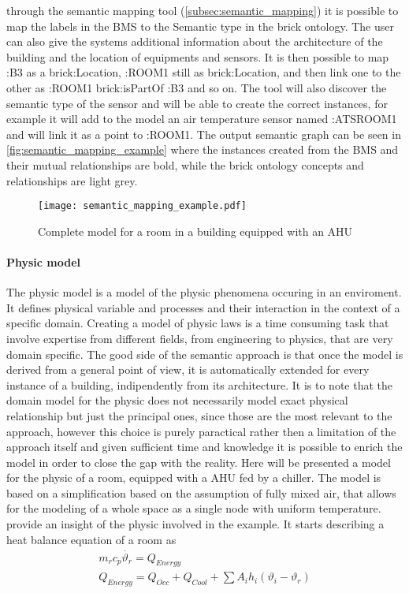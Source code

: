 through the semantic mapping tool (\ref{subsec:semantic_mapping}) it is possible to map the labels in the BMS to the Semantic type in the brick ontology. The user can also give the systems additional information about the architecture of the building and the location of equipments and sensors. It is then possible to map :B3 as a brick:Location, :ROOM1 still as brick:Location, and then link one to the other as :ROOM1 brick:isPartOf :B3 and so on. The tool will also discover the semantic type of the sensor and will be able to create the correct instances, for example it will add to the model an air temperature sensor named :ATSROOM1 and will link it as a point to :ROOM1. The output semantic graph can be seen in \autoref{fig:semantic_mapping_example} where the instances created from the BMS and their mutual relationships are bold, while the brick ontology concepts and relationships are light grey.

\begin{figure}
  \texttt{[image: semantic\_mapping\_example.pdf]}
  \caption{Complete model for a room in a building equipped with an AHU}
  \label{fig:semantic_mapping_example}
\end{figure}

\paragraph{Physic model}
The physic model is a model of the physic phenomena occuring in an enviroment. It defines physical variable and processes and their interaction in the context of a specific domain. Creating a model of physic laws is a time consuming task that involve expertise from different fields, from engineering to physics, that are very domain specific. The good side of the semantic approach is that once the model is derived from a general point of view, it is automatically extended for every instance of a building, indipendently from its architecture. It is to note that the domain model for the physic does not necessarily model exact physical relationship but just the principal ones, since those are the most relevant to the approach, however this choice is purely paractical rather then a limitation of the approach itself and given sufficient time and knowledge it is possible to enrich the model in order to close the gap with the reality. Here will be presented a model for the physic of a room, equipped with a AHU fed by a chiller. The model is based on a simplification based on the assumption of fully mixed air, that allows for the modeling of a whole space as a single node with uniform temperature. \textcite{building_room_physics} provide an insight of the physic involved in the example. It starts describing a heat balance equation of a room as
\begin{gather}
  m_rc_p\dot{\vartheta_{r}}=Q_{Energy}\label{eq:room_variables}\\
  Q_{Energy}=Q_{Occ}+Q_{Cool}+\sum{A_ih_i(\vartheta_{i}-\vartheta_{r})}\label{eq:energy_composition}\\
\end{gather}

